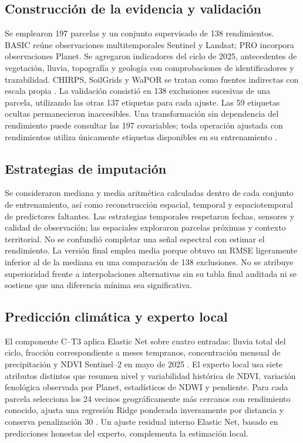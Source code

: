 \subsection*{Construcción de la evidencia y validación}
Se emplearon 197 parcelas y un conjunto supervisado de 138 rendimientos. BASIC reúne observaciones multitemporales Sentinel y Landsat; PRO incorpora observaciones Planet. Se agregaron indicadores del ciclo de 2025, antecedentes de vegetación, lluvia, topografía y geología con comprobaciones de identificadores y trazabilidad. CHIRPS, SoilGrids y WaPOR se tratan como fuentes indirectas con escala propia \parencite{Funk2015CHIRPS,Poggio2021SoilGrids,FAOWaPOR,Dhonthi2024}. La validación consistió en 138 exclusiones sucesivas de una parcela, utilizando las otras 137 etiquetas para cada ajuste. Las 59 etiquetas ocultas permanecieron inaccesibles. Una transformación sin dependencia del rendimiento puede consultar las 197 covariables; toda operación ajustada con rendimientos utiliza únicamente etiquetas disponibles en su entrenamiento \parencite{Stone1974,Chapelle2006}.

\subsection*{Estrategias de imputación}
Se consideraron mediana y media aritmética calculadas dentro de cada conjunto de entrenamiento, así como reconstrucción espacial, temporal y espaciotemporal de predictores faltantes. Las estrategias temporales respetaron fechas, sensores y calidad de observación; las espaciales exploraron parcelas próximas y contexto territorial. No se confundió completar una señal espectral con estimar el rendimiento. La versión final emplea media porque obtuvo un RMSE ligeramente inferior al de la mediana en una comparación de 138 exclusiones. No se atribuye superioridad frente a interpolaciones alternativas sin su tabla final auditada ni se sostiene que una diferencia mínima sea significativa.

\subsection*{Predicción climática y experto local}
El componente C--T3 aplica Elastic Net sobre cuatro entradas: lluvia total del ciclo, fracción correspondiente a meses tempranos, concentración mensual de precipitación y NDVI Sentinel--2 en mayo de 2025 \parencite{ZouHastie2005}. El experto local usa siete atributos distintos que resumen nivel y variabilidad histórica de NDVI, variación fenológica observada por Planet, estadísticos de NDWI y pendiente. Para cada parcela selecciona los 24 vecinos geográficamente más cercanos con rendimiento conocido, ajusta una regresión Ridge ponderada inversamente por distancia y conserva penalización 30 \parencite{HoerlKennard1970}. Un ajuste residual interno Elastic Net, basado en predicciones honestas del experto, complementa la estimación local.

